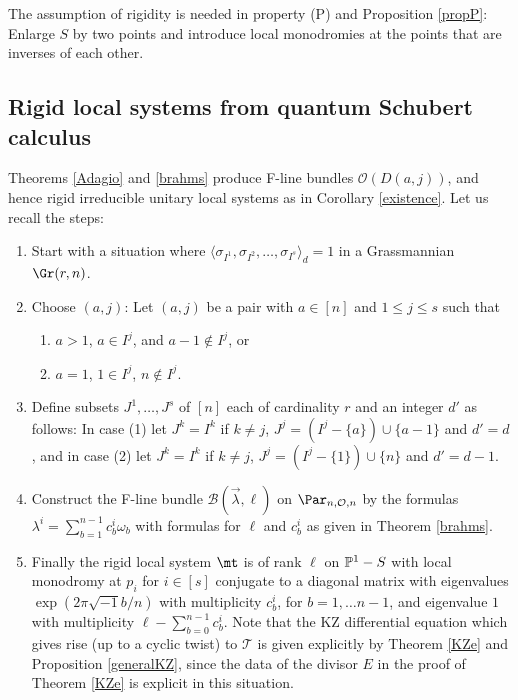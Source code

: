 \begin{remark}
\notready\label{moreR} The assumption of rigidity is needed in property (P) and Proposition \ref{propP}: Enlarge $S$ by two points and introduce local monodromies at the points that are inverses of each other.
\end{remark}


\subsection{Rigid local systems from quantum Schubert calculus}\label{qSC}
Theorems \ref{Adagio} and \ref{brahms} produce F-line bundles $\mathcal{O}(D(a,j))$, and hence rigid irreducible unitary local systems as in Corollary \ref{existence}. Let us recall the steps:
\begin{enumerate}
\item [(i)]Start with a situation where
 $\langle\sigma_{I^1}, \sigma_{I^2},\dots,\sigma_{I^s}\rangle_d= 1$ in a Grassmannian $\Gr(r,n)$.
\item[(ii)] Choose $(a,j)$: Let $(a,j)$ be a pair with $a\in[n]$ and $1\leq j\leq s$ such that
\begin{enumerate}
\item $a>1$, $a\in I^j$, and $a-1\not\in I^j$, or
\item $a=1$, $1\in I^j$, $n\not\in I^j$.
\end{enumerate}
\item[(iii)] Define subsets $J^1,\dots,J^s$ of $[n]$ each of cardinality $r$ and an integer $d'$ as follows:
In case (1) let $J^k=I^k$ if $k\neq j$, $J^j=(I^j-\{a\}) \cup \{a-1\}$ and $d'=d$, and in case (2) let  $J^k=I^k$ if $k\neq j$, $J^j=(I^j-\{1\}) \cup \{n\}$ and $d'=d-1$.
\item[(iv)] Construct the F-line bundle $\mathcal{B}(\vec{\lambda},\ell)$ on $\Par_{n,\mathcal{O},n}$
by the formulas $\lambda^i=\sum_{b=1}^{n-1}c^i_b\omega_b$ with formulas for $\ell$ and $c^i_b$
as given in Theorem \ref{brahms}.
 \item[(v)] Finally the rigid local system $\mt$ is of rank $\ell$ on $\Bbb{P}^1-S$ with local monodromy at $p_i$ for $i\in[s]$
 conjugate to a diagonal matrix with eigenvalues $\exp(2\pi\sqrt{-1}b/n)$ with multiplicity $c^i_b$, for $b=1,\dots n-1$, and eigenvalue $1$ with multiplicity $\ell-\sum_{b=0}^{n-1} c^i_b$. Note that the KZ differential equation which gives rise (up to a cyclic twist) to $\mathcal{T}$ is given explicitly by Theorem \ref{KZe} and Proposition \ref{generalKZ}, since the data of the divisor $E$ in the proof of Theorem \ref{KZe} is explicit in this situation.
 \end{enumerate}

